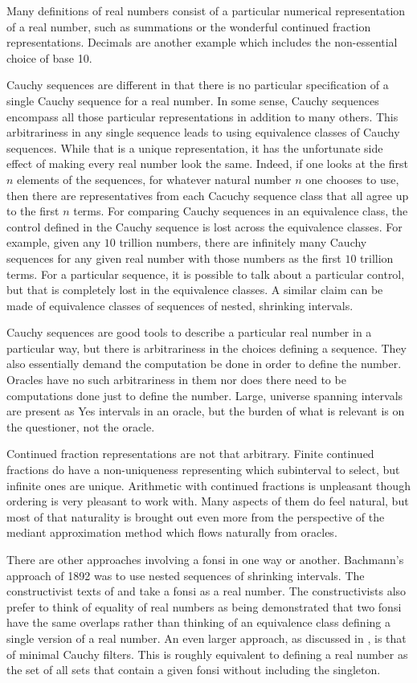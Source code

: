 \documentclass[12pt]{article}
\theoremstyle{remark}
\begin{document}
Many definitions of real numbers consist of a particular numerical representation of a real number, such as summations or the wonderful continued fraction representations. Decimals are another example which includes the non-essential choice of base 10. 

Cauchy sequences are different in that there is no particular specification of a single Cauchy sequence for a real number. In some sense, Cauchy sequences encompass all those particular representations in addition to many others. This arbitrariness in any single sequence leads to using equivalence classes of Cauchy sequences. While that is a unique representation, it has the unfortunate side effect of making every real number look the same. Indeed, if one looks at the first $n$ elements of the sequences, for whatever natural number $n$ one chooses to use, then there are representatives from each Cacuchy sequence class that all agree up to the first $n$ terms. For comparing Cauchy sequences in an equivalence class, the control defined in the Cauchy sequence is lost across the equivalence classes. For example, given any $10$ trillion numbers, there are infinitely many Cauchy sequences for any given real number with those numbers as the first $10$ trillion terms. For a particular sequence, it is possible to talk about a particular control, but that is completely lost in the equivalence classes. A similar claim can be made of equivalence classes of sequences of nested, shrinking intervals. 

Cauchy sequences are good tools to describe a particular real number in a particular way, but there is arbitrariness in the choices defining a sequence. They also essentially demand the computation be done in order to define the number. Oracles have no such arbitrariness in them nor does there need to be computations done just to define the number. Large, universe spanning intervals are present as Yes intervals in an oracle, but the burden of what is relevant is on the questioner, not the oracle. 

Continued fraction representations are not that arbitrary. Finite continued fractions do have a non-uniqueness representing which subinterval to select, but infinite ones are unique. Arithmetic with continued fractions is unpleasant though ordering is very pleasant to work with. Many aspects of them do feel natural, but most of that naturality is brought out even more from the perspective of the mediant approximation method which flows naturally from oracles. 

There are other approaches involving a fonsi in one way or another. Bachmann's approach of 1892 was to use nested sequences of shrinking intervals. The constructivist texts of \cite{bridger} and \cite{bridges} take a fonsi as a real number. The constructivists also prefer to think of equality of real numbers as being demonstrated that two fonsi have the same overlaps rather than thinking of an equivalence class defining a single version of a real number. An even larger approach, as discussed in \cite{ittay-2015}, is that of minimal Cauchy filters. This is roughly equivalent to defining a real number as the set of all sets that contain a given fonsi without including the singleton. 
\end{document}
